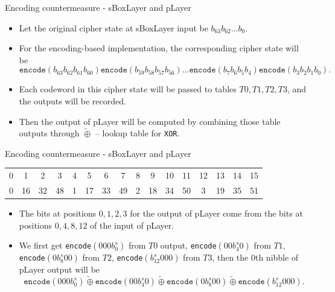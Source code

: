 \begin{frame}{Encoding countermeasure - sBoxLayer and pLayer}
    \begin{itemize}
        \item Let the original cipher state at sBoxLayer input be $b_{63}b_{62}\dots b_0$.
        \item For the encoding-based implementation, the corresponding cipher state will be 
        \[
        \texttt{encode}(b_{63}b_{62}b_{61}b_{60}) \texttt{encode}(b_{59}b_{58}b_{57}b_{56})
\dots
\texttt{encode}(b_{7}b_{6}b_{5}b_{4})
\texttt{encode}(b_{3}b_{2}b_{1}b_{0}).
\]
\item Each codeword in this cipher state will be passed to tables $T0,T1,T2,T3$, and the outputs will be recorded.
\item Then the output of pLayer will be computed by combining those table outputs through $\widetilde{\oplus}$ -- lookup table for \texttt{XOR}.
    \end{itemize}
\end{frame}


\begin{frame}{Encoding countermeasure - sBoxLayer and pLayer}
\begin{table}[h]
\centering
\begin{tabular}{cccccccccccccccc}\hline
0 & 1 & 2 & 3 & 4 & 5 & 6 & 7 & 8 & 9 & 10 & 11 & 12 & 13 & 14 & 15 \\
0 & 16 & 32 & 48 & 1 & 17 & 33 & 49 & 2 & 18 & 34 & 50 & 3 & 19 & 35 & 51 \\\hline
\end{tabular}
\end{table}
\begin{example}
    \begin{itemize}
        \item The bits at positions $0,1,2,3$ for the output of pLayer come from the bits at positions $0,4,8,12$ of the input of pLayer.
       \item We first get \texttt{encode}$(000b_0^s)$ from $T0$ output, \texttt{encode}$(00b_4^s0)$ from $T1$, \texttt{encode}$(0b_8^s00)$ from $T2$, \texttt{encode}$(b_{12}^s000)$ from $T3$, then the $0$th nibble of pLayer output will be
\[
\texttt{encode}(000b_0^s)\widetilde{\oplus}\texttt{encode}(00b_4^s0)\widetilde{\oplus}\texttt{encode}(0b_8^s00)\widetilde{\oplus}\texttt{encode}(b_{12}^s000).
\]
    \end{itemize}
\end{example}
\end{frame}

